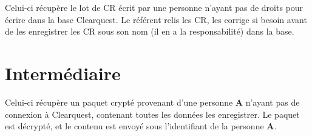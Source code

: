 \documentclass[11pt,a4paper,final]{article}
\begin{document}
Celui-ci récupère le lot de CR écrit par une personne n'ayant pas de droits pour écrire dans la base Clearquest. Le référent relis les CR, les corrige si besoin avant de les enregistrer les CR sous son nom (il en a la responsabilité) dans la base.

\section{Intermédiaire}

Celui-ci récupère un paquet crypté provenant d'une personne \textbf{A} n'ayant pas de connexion à Clearquest, contenant toutes les données les enregistrer. Le paquet est décrypté, et le contenu est envoyé sous l'identifiant de la personne \textbf{A}.
\end{document}
